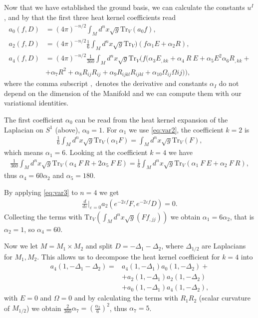 Now that we have established the ground basis, we can calculate the constants
$u^I$, and by that the first three heat kernel coefficients read
\begin{align}
    a_0(f, D) &= (4\pi)^{-n/2}\int_Md^n x\sqrt{g} \text{Tr}_V(a_0 f),\\
    a_2(f, D) &= (4\pi)^{-n/2}\frac{1}{6}\int_Md^n
    x\sqrt{g}\text{Tr}_V)(f\alpha _1 E+\alpha _2 R),\\
    a_4(f, D) &= (4\pi)^{-n/2}\frac{1}{360}\int_Md^n
    x\sqrt{g}\text{Tr}_V(f(\alpha_3 E_{,kk} + \alpha_4\ R\ E + \alpha_5 E^2
    \alpha_6 R_{,kk} + \nonumber\\
    &+\alpha_7 R^2 + \alpha_8 R_{ij}R_{ij} + \alpha_9
    R_{ijkl}R_{ijkl} +\alpha_{10} \Omega_{ij}\Omega{ij})),
\end{align}
where the comma subscript $,$ denotes the derivative and constants $\alpha_I$
do not depend on the dimension of the Manifold and we can compute them with
our variational identities.

The first coefficient $\alpha_0$ can be read from the heat kernel expansion of
the Laplacian on $S^1$ (above), $\alpha_0 = 1$. For $\alpha_1$ we use
\eqref{eq:var2}, the coefficient $k = 2$ is
\begin{align}
    \frac{1}{6} \int_M d^n x\sqrt{g} \text{Tr}_V(\alpha_1F) = \int_M d^n
    x\sqrt{g} \text{Tr}_V(F),
\end{align}
which means $\alpha_1 = 6$. Looking at the coefficient $k=4$ we have
\begin{align}
    \frac{1}{360}\int_Md^n x \sqrt{g}\text{Tr}_V(\alpha_4\ F\ R + 2\alpha_5\ F\ E)
    = \frac{1}{6} \int_Md^n x\sqrt{g}\text{Tr}_V(\alpha_1\ F\ E + \alpha_2\ F\ R),
\end{align}
thus $\alpha_4 = 60\alpha_2$ and $\alpha_5 = 180$.

By applying  \eqref{eq:var3} to $n=4$ we get
\begin{align}
    \frac{d}{d\varepsilon}|_{\varepsilon=0} a_2(e^{-2\varepsilon f}F,
    e^{-2\varepsilon f}D) = 0.
\end{align}
Collecting the terms with $\text{Tr}_V(\int_Md^nx\sqrt{g}(Ff_{,jj}))$ we
obtain $\alpha_1 = 6\alpha_2$, that is $\alpha_2 = 1$, so $\alpha_4 = 60$.

Now we let $M=M_1\times M_2$ and split $D = -\Delta_1 -\Delta_2$, where
$\Delta_{1/2}$ are Laplacians for $M_1, M_2$. This allows us to decompose the heat
kernel coefficient for $k=4$ into
\begin{align}
    a_4(1,-\Delta_1-\Delta_2) =& a_4(1, -\Delta_1) a_0(1,
    -\Delta_2)\nonumber+ \\
                               &+a_2(1,-\Delta_1) a_2(1,-\Delta_2)\nonumber \\
                               &+ a_0(1,-\Delta_1)a_4(1,-\Delta_2),
\end{align}
with $E=0$ and $\Omega =0$ and by calculating the terms with $R_1R_2$  (scalar
curvature of $M_{1/2}$) we obtain $\frac{2}{360}\alpha_7 =
(\frac{\alpha_2}{6})^2$, thus $\alpha_7 = 5$.

